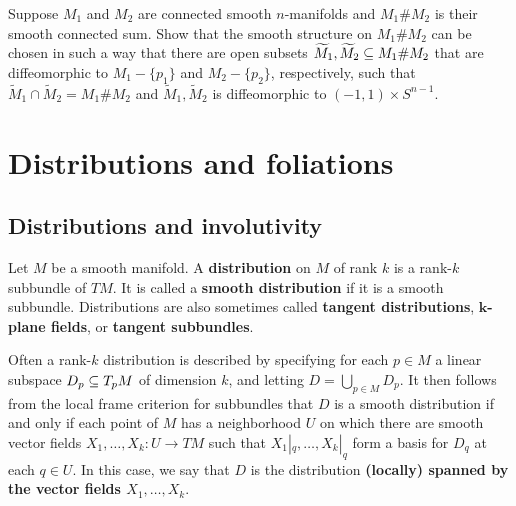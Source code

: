 \begin{exercise}
Suppose $M_1$ and $M_2$ are connected smooth $n$-manifolds and $M_1\#M_2$ is their smooth connected sum. Show that the smooth structure on $M_1\#M_2$ can be chosen in such a way that there are open subsets $\widetilde{M}_1,\widetilde{M}_2\subseteq M_1\#M_2$ that are diffeomorphic to $M_1-\{p_1\}$ and $M_2-\{p_2\}$, respectively, such that $\widetilde{M}_1\cap\widetilde{M}_2=M_1\#M_2$ and $\widetilde{M}_1,\widetilde{M}_2$ is diffeomorphic to $(-1,1)\times S^{n-1}$.
\end{exercise}
\section{Distributions and foliations}
\subsection{Distributions and involutivity}
Let $M$ be a smooth manifold. A \textbf{distribution} on $M$ of rank $k$ is a rank-$k$ subbundle of $TM$. It is called a \textbf{smooth distribution} if it 
is a smooth subbundle. Distributions are also sometimes called \textbf{tangent distributions}, \textbf{$\bm{k}$-plane fields}, or \textbf{tangent subbundles}.\par
Often a rank-$k$ distribution is described by specifying for each $p\in M$ a linear subspace $D_p\subseteq T_pM$ of dimension $k$, and letting $D=\bigcup_{p\in M}D_p$. 
It then follows from the local frame criterion for subbundles that $D$ is a smooth distribution if and only if each point of $M$ has a neighborhood $U$ on which 
there are smooth vector fields $X_1,\dots,X_k:U\to TM$ such that $X_1|_q,\dots,X_k|_q$ form a basis for $D_q$ at each $q\in U$. In this case, we say that $D$ is 
the distribution \textbf{(locally) spanned by the vector fields \boldmath$X_1,\dots,X_k$}.

